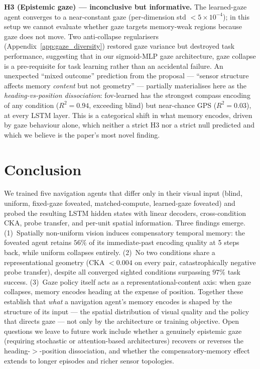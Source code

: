 \documentclass[10pt,conference,compsocconf]{IEEEtran}
\begin{document}
\textbf{H3 (Epistemic gaze) --- inconclusive but informative.} The learned-gaze agent converges to a near-constant gaze (per-dimension std $< 5\times 10^{-4}$); in this setup we cannot evaluate whether gaze targets memory-weak regions because gaze does not move. Two anti-collapse regularisers (Appendix~\ref{app:gaze_diversity}) restored gaze variance but destroyed task performance, suggesting that in our sigmoid-MLP gaze architecture, gaze collapse is a pre-requisite for task learning rather than an accidental failure. An unexpected ``mixed outcome'' prediction from the proposal --- ``sensor structure affects memory \emph{content} but not geometry'' --- partially materialises here as the \emph{heading-vs-position dissociation}: fov-learned has the strongest compass encoding of any condition ($R^2=0.94$, exceeding blind) but near-chance GPS ($R^2=0.03$), at every LSTM layer. This is a categorical shift in what memory encodes, driven by gaze behaviour alone, which neither a strict H3 nor a strict null predicted and which we believe is the paper's most novel finding.

\section{Conclusion}

We trained five navigation agents that differ only in their visual input (blind, uniform, fixed-gaze foveated, matched-compute, learned-gaze foveated) and probed the resulting LSTM hidden states with linear decoders, cross-condition CKA, probe transfer, and per-unit spatial information. Three findings emerge. (1)~Spatially non-uniform vision induces compensatory temporal memory: the foveated agent retains $56\%$ of its immediate-past encoding quality at 5 steps back, while uniform collapses entirely. (2)~No two conditions share a representational geometry (CKA $< 0.004$ on every pair, catastrophically negative probe transfer), despite all converged sighted conditions surpassing $97\%$ task success. (3)~Gaze policy itself acts as a representational-content axis: when gaze collapses, memory encodes heading at the expense of position. Together these establish that \emph{what} a navigation agent's memory encodes is shaped by the structure of its input --- the spatial distribution of visual quality and the policy that directs gaze --- not only by the architecture or training objective. Open questions we leave to future work include whether a genuinely epistemic gaze (requiring stochastic or attention-based architectures) recovers or reverses the heading-$>$-position dissociation, and whether the compensatory-memory effect extends to longer episodes and richer sensor topologies.
\end{document}
